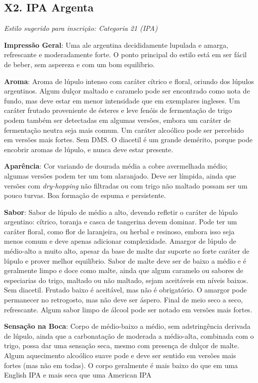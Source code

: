 \subsection*{X2. IPA Argenta}

\textit{Estilo sugerido para inscrição: Categoria 21 (IPA)}

\textbf{Impressão Geral}: Uma ale argentina decididamente lupulada e amarga, refrescante e moderadamente forte. O ponto principal do estilo está em ser fácil de beber, sem aspereza e com um bom equilíbrio.

\textbf{Aroma}: Aroma de lúpulo intenso com caráter cítrico e floral, oriundo dos lúpulos argentinos. Algum dulçor maltado e caramelo pode ser encontrado como nota de fundo, mas deve estar em menor intensidade que em exemplares ingleses. Um caráter frutado proveniente de ésteres e leve fenóis de fermentação de trigo podem também ser detectadas em algumas versões, embora um caráter de fermentação neutra seja mais comum. Um caráter alcoólico pode ser percebido em versões mais fortes. Sem DMS. O diacetil é um grande demérito, porque pode encobrir aromas de lúpulo, e nunca deve estar presente.

\textbf{Aparência}: Cor variando de dourada média a cobre avermelhada médio; algumas versões podem ter um tom alaranjado. Deve ser límpida, ainda que versões com \textit{dry-hopping} não filtradas ou com trigo não maltado possam ser um pouco turvas. Boa formação de espuma e persistente.

\textbf{Sabor}: Sabor de lúpulo de médio a alto, devendo refletir o caráter de lúpulo argentino: cítrico, toranja e casca de tangerina devem dominar. Pode ter um caráter floral, como flor de laranjeira, ou herbal e resinoso, embora isso seja menos comum e deve apenas adicionar complexidade. Amargor de lúpulo de médio-alto a muito alto, apesar da base de malte dar suporte ao forte caráter de lúpulo e prover melhor equilíbrio. Sabor de malte deve ser de baixo a médio e é geralmente limpo e doce como malte, ainda que algum caramelo ou sabores de especiarias do trigo, maltado ou não maltado, sejam aceitáveis em níveis baixos. Sem diacetil. Frutado baixo é aceitável, mas não é obrigatório. O amargor pode permanecer no retrogosto, mas não deve ser áspero. Final de meio seco a seco, refrescante. Algum sabor limpo de álcool pode ser notado em versões mais fortes.

\textbf{Sensação na Boca}: Corpo de médio-baixo a médio, sem adstringência derivada de lúpulo, ainda que a carbonatação de moderada a médio-alta, combinada com o trigo, possa dar uma sensação seca, mesmo com presença de dulçor de malte. Algum aquecimento alcoólico suave pode e deve ser sentido em versões mais fortes (mas não em todas). O corpo geralmente é mais baixo do que em uma English IPA e mais seca que uma American IPA

